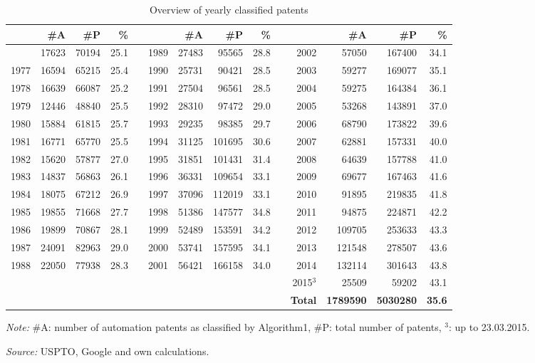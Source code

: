 \begin{table}[!htb]
\begin{small}
\begin{threeparttable}
\caption{{\normalsize Overview of yearly classified patents}}
\label{table:table_yearsstats}
\begin{tabular}{rrrrrrrrrrrrrr}
\toprule \addlinespace[0.5em]
 & \textbf{\#A} & \textbf{\#P} & \textbf{\%} & \phantom{aaa} & & \textbf{\#A} & \textbf{\#P} & \textbf{\%} & \phantom{aaa} & & \textbf{\#A} & \textbf{\#P} & \textbf{\%}\tabularnewline[0.1cm]
\midrule \addlinespace[0.5em]
1976 & 17623 & 70194 & 25.1 & & 1989 & 27483 & 95565 & 28.8 & & 2002 & 57050 & 167400 & 34.1 \tabularnewline[0.1cm]
1977 & 16594 & 65215 & 25.4 & & 1990 & 25731 & 90421 & 28.5 & & 2003 & 59277 & 169077 & 35.1 \tabularnewline[0.1cm]
1978 & 16639 & 66087 & 25.2 & & 1991 & 27504 & 96561 & 28.5 & & 2004 & 59275 & 164384 & 36.1 \tabularnewline[0.1cm]
1979 & 12446 & 48840 & 25.5 & & 1992 & 28310 & 97472 & 29.0 & & 2005 & 53268 & 143891 & 37.0 \tabularnewline[0.1cm]
1980 & 15884 & 61815 & 25.7 & & 1993 & 29235 & 98385 & 29.7 & & 2006 & 68790 & 173822 & 39.6 \tabularnewline[0.1cm]
1981 & 16771 & 65770 & 25.5 & & 1994 & 31125 & 101695 & 30.6 & & 2007 & 62881 & 157331 & 40.0 \tabularnewline[0.1cm]
1982 & 15620 & 57877 & 27.0 & & 1995 & 31851 & 101431 & 31.4 & & 2008 & 64639 & 157788 & 41.0 \tabularnewline[0.1cm]
1983 & 14837 & 56863 & 26.1 & & 1996 & 36331 & 109654 & 33.1 & & 2009 & 69677 & 167463 & 41.6 \tabularnewline[0.1cm]
1984 & 18075 & 67212 & 26.9 & & 1997 & 37096 & 112019 & 33.1 & & 2010 & 91895 & 219835 & 41.8 \tabularnewline[0.1cm]
1985 & 19855 & 71668 & 27.7 & & 1998 & 51386 & 147577 & 34.8 & & 2011 & 94875 & 224871 & 42.2 \tabularnewline[0.1cm]
1986 & 19899 & 70867 & 28.1 & & 1999 & 52489 & 153591 & 34.2 & & 2012 & 109705 & 253633 & 43.3 \tabularnewline[0.1cm]
1987 & 24091 & 82963 & 29.0 & & 2000 & 53741 & 157595 & 34.1 & & 2013 & 121548 & 278507 & 43.6 \tabularnewline[0.1cm]
1988 & 22050 & 77938 & 28.3 & & 2001 & 56421 & 166158 & 34.0 & & 2014 & 132114 & 301643 & 43.8 \tabularnewline[0.1cm]
& & & & & & & & & & 2015$^3$ & 25509 & 59202 & 43.1  \tabularnewline[0.1cm]
& & & & & & & & & & \textbf{Total} & \textbf{1789590} & \textbf{5030280} & \textbf{35.6} \tabularnewline[0.1cm]
\bottomrule\end{tabular}
\begin{tablenotes}
\small
\item\textit{Note:} \#A: number of automation patents as classified by Algorithm1, \#P: total number of patents, $^3$: up to 23.03.2015.
\item\textit{Source:} USPTO, Google and own calculations.
\end{tablenotes}
\end{threeparttable}
\end{small}
\end{table}
